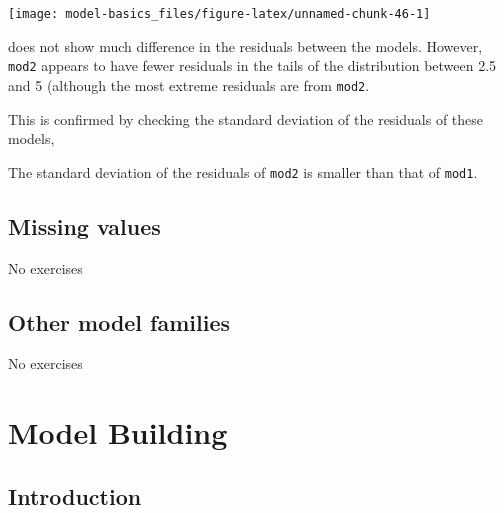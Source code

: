 \documentclass[]{book}
\newenvironment{Shaded}{\begin{snugshade}}{\end{snugshade}}
\newcommand{\CommentTok}[1]{\textcolor[rgb]{0.56,0.35,0.01}{\textit{#1}}}
\newcommand{\DataTypeTok}[1]{\textcolor[rgb]{0.13,0.29,0.53}{#1}}
\newcommand{\KeywordTok}[1]{\textcolor[rgb]{0.13,0.29,0.53}{\textbf{#1}}}
\newcommand{\NormalTok}[1]{#1}
\newcommand{\OperatorTok}[1]{\textcolor[rgb]{0.81,0.36,0.00}{\textbf{#1}}}
\newcommand{\StringTok}[1]{\textcolor[rgb]{0.31,0.60,0.02}{#1}}
\theoremstyle{definition}
\theoremstyle{definition}
\theoremstyle{definition}
\theoremstyle{remark}
\begin{document}
\begin{center}\texttt{[image: model-basics\_files/figure-latex/unnamed-chunk-46-1]} \end{center}

does not show much difference in the residuals between the models.
However, \texttt{mod2} appears to have fewer residuals in the tails of
the distribution between 2.5 and 5 (although the most extreme residuals
are from \texttt{mod2}.

This is confirmed by checking the standard deviation of the residuals of
these models,

\begin{Shaded}
\end{Shaded}

The standard deviation of the residuals of \texttt{mod2} is smaller than
that of \texttt{mod1}.

\hypertarget{missing-values-2}{%
\section{Missing values}\label{missing-values-2}}

No exercises

\hypertarget{other-model-families}{%
\section{Other model families}\label{other-model-families}}

No exercises

\hypertarget{model-building}{%
\chapter{Model Building}\label{model-building}}

\hypertarget{introduction-14}{%
\section{Introduction}\label{introduction-14}}
\end{document}
